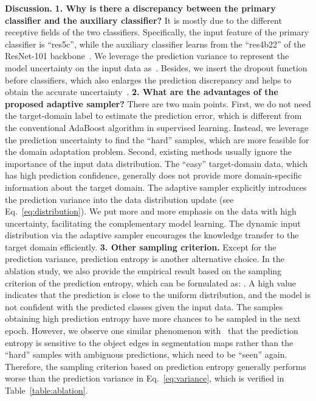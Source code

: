 \documentclass[journal]{IEEEtran}
\begin{document}
\noindent\textbf{Discussion.} 
\textbf{1. Why is there a discrepancy between the primary classifier and the auxiliary classifier?} It is mostly due to the different receptive fields of the two classifiers. Specifically, the input feature of the primary classifier is ``res5c'', while the auxiliary classifier learns from the ``res4b22'' of the ResNet-101 backbone~\cite{he2016deep}. We leverage the prediction variance to represent the model uncertainty on the input data as~\cite{zheng2020unsupervised}. Besides, we insert the dropout function before classifiers, which also enlarges the prediction discrepancy and helps to obtain the accurate uncertainty~\cite{gal2016dropout}. 
\textbf{2. What are the advantages of the proposed adaptive sampler?} There are two main points. First, we do not need the target-domain label to estimate the prediction error, which is different from the conventional AdaBoost algorithm in supervised learning. Instead, we leverage the prediction uncertainty to find the ``hard'' samples, which are more feasible for the domain adaptation problem. 
Second, existing methods usually ignore the importance of the input data distribution. The ``easy'' target-domain data, which  has high prediction confidence, generally does not provide more domain-specific information about the target domain. The adaptive sampler explicitly introduces the prediction variance into the data distribution update (see Eq.~\ref{eq:distribution}). We put more and more emphasis on the data with high uncertainty, facilitating the complementary model learning. The dynamic input distribution via the adaptive sampler encourages the knowledge transfer to the target domain efficiently.  
\textbf{3. Other sampling criterion.} Except for the prediction variance, prediction entropy is another alternative choice. In the ablation study, we also provide the empirical result based on the sampling criterion of the prediction entropy, which can be formulated as: . A high value indicates that the prediction is close to the uniform distribution, and the model is not confident with the predicted classes given the input data. The samples obtaining high prediction entropy have more chances to be sampled in the next epoch. However, we observe one similar phenomenon with~\cite{zheng2020unsupervised} that the prediction entropy is sensitive to the object edges in segmentation maps rather than the ``hard'' samples with ambiguous predictions, which need to be ``seen'' again. Therefore, the sampling criterion based on prediction entropy generally performs worse than the prediction variance in Eq.~\ref{eq:variance}, which is verified in Table~\ref{table:ablation}.
\end{document}
